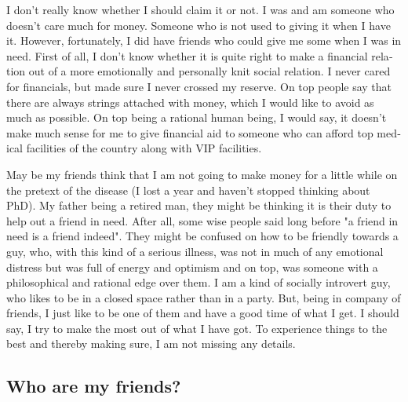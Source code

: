 \begin{english}
I don't really know whether I should claim it or not. I was and am someone who doesn't care much 
for money. Someone who is not used to giving it when I have it. However, fortunately, I did have friends who could give me 
some when I was in need. First of all, I don't know whether it is quite right to make a financial 
relation out of a more emotionally and personally knit social relation. I never cared for financials, 
but made sure I never crossed my reserve. On top people say that there are always strings attached with 
money, which I would like to avoid as much as possible. On top being a rational human being, I would 
say, it doesn't make much sense for me to give financial aid to someone who can afford top medical facilities of the country along with VIP facilities. 

May be my friends think that I am not going to make money for a little while on the pretext of 
the disease (I lost a year and haven't stopped thinking about PhD). My father being a retired man, 
they might be thinking it is their duty to help out a friend in need. After all, some wise people said 
long before "a friend in need is a friend indeed". They might be confused on how to be friendly 
towards a guy, who, with this kind of a serious illness, was not in much of any emotional distress but was full of energy 
and optimism and on top, was someone with a philosophical and rational edge over them. I am a kind of socially
introvert guy, who likes to be in a closed space rather than in a party. But, being in company of friends, 
I just like to be one of them and have a good time of what I get. I should say, I try to make the
most out of what I have got. To experience things to the best and thereby making sure, I am not missing any details. 

\subsection*{Who are my friends?}


\end{english}

